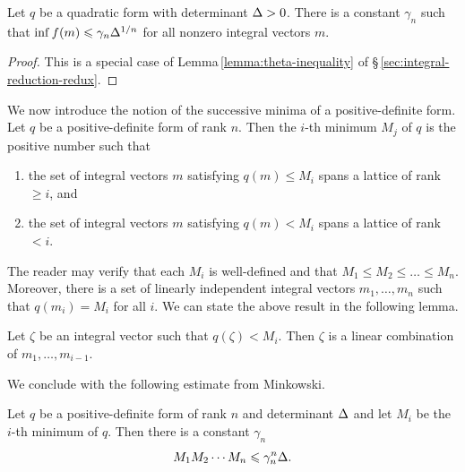 \begin{theoremx}\label{thm:minkowski-infimum}
    {\normalfont \cite[p.\,260]{cassels2008rational}}
    Let \(q\) be a quadratic form with determinant \({\Delta} > 0\). There is a constant \(\gamma_n\) such that \(\inf f(m) \leqslant \gamma_n{\Delta}^{1/n}\) for all nonzero integral vectors \(m\).
\end{theoremx}

\begin{proof}
    This is a special case of Lemma\,\ref{lemma:theta-inequality} of \S\,\ref{sec:integral-reduction-redux}.
\end{proof}

\bigskip

We now introduce the notion of the successive minima of a positive-definite form. Let \(q\) be a positive-definite form of rank \(n\). Then the \(i\)-th minimum \(M_j\) of \(q\) is the positive number such that

\medskip

\begin{enumerate}[nosep, label=(\roman*)]
    \item the set of integral vectors \(m\) satisfying \(q(m) \leq M_i\) spans a lattice of rank \(\geq i\), and
    \item the set of integral vectors \(m\) satisfying \(q(m) < M_i\) spans a lattice of rank \(< i\).
\end{enumerate}

\medskip 

The reader may verify that each \(M_i\) is well-defined and that \(M_1 \leq M_2 \leq \dots \leq M_n\). Moreover, there is a set of linearly independent integral vectors \(m_1, \dots, m_n\) such that \(q(m_i) = M_i\) for all \(i\). We can state the above result in the following lemma.

\begin{lemma}
    Let \(\zeta\) be an integral vector such that \(q(\zeta) < M_i\). Then \(\zeta\) is a linear combination of \(m_1, \dots, m_{i-1}\).
\end{lemma}

We conclude with the following estimate from Minkowski.

\begin{theoremx}\label{thm:minkowski-successive-minima}
    {\normalfont \cite[p.\,262--263]{cassels2008rational}}
    Let \(q\) be a positive-definite form of rank \(n\) and determinant \({\Delta}\) and let \(M_i\) be the \(i\)-th minimum of \(q\). Then there is a constant \(\gamma_n\)
    \[
        M_1 M_2 \cdots M_n \leqslant \gamma_n^n {\Delta}.
    \]
\end{theoremx}

